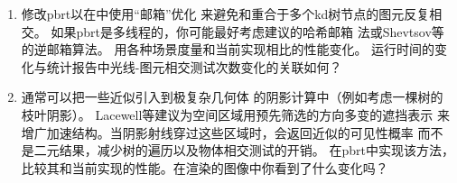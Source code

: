 \begin{enumerate}
    \item \circletwo 修改pbrt以在中使用“邮箱”优化
          来避免和重合于多个kd树节点的图元反复相交。
          如果pbrt是多线程的，你可能最好考虑\citet{Benthin_2006}建议的哈希邮箱
          法或Shevtsov等\parencite*{shevtsov2007ray}
          的逆邮箱算法。
          用各种场景度量和当前实现相比的性能变化。
          运行时间的变化与统计报告中光线-图元相交测试次数变化的关联如何？
    \item \circlethree 通常可以把一些近似引入到极复杂几何体
          的阴影计算中（例如考虑一棵树的枝叶阴影）。
          Lacewell等\parencite*{4634616}建议为空间区域用预先筛选的方向多变的遮挡表示
          来增广加速结构。当阴影射线穿过这些区域时，会返回近似的可见性概率
          而不是二元结果，减少树的遍历以及物体相交测试的开销。
          在pbrt中实现该方法，比较其和当前实现的性能。在渲染的图像中你看到了什么变化吗？
\end{enumerate}